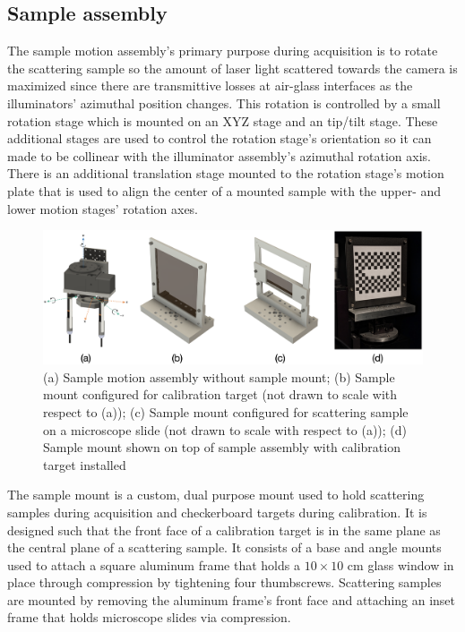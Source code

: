 \subsection{Sample assembly}
The sample motion assembly's primary purpose during acquisition is to rotate the scattering sample so the amount of laser light scattered towards the camera is maximized since there are transmittive losses at air-glass interfaces as the illuminators' azimuthal position changes. This rotation is controlled by a small rotation stage which is mounted on an XYZ stage and an tip/tilt stage. These additional stages are used to control the rotation stage's orientation so it can made to be collinear with the illuminator assembly's azimuthal rotation axis. There is an additional translation stage mounted to the rotation stage's motion plate that is used to align the center of a mounted sample with the upper- and lower motion stages' rotation axes.
%
\begin{figure}
    \centering
    \includegraphics[width=\linewidth]{../figures/sample_assembly_summary.png}
    \caption{(a) Sample motion assembly without sample mount; (b) Sample mount configured for calibration target (not drawn to scale with respect to (a)); (c) Sample mount configured for scattering sample on a microscope slide (not drawn to scale with respect to (a)); (d) Sample mount shown on top of sample assembly with calibration target installed}
    \label{fig:sample_motion_assy}
\end{figure}

The sample mount is a custom, dual purpose mount used to hold scattering samples during acquisition and checkerboard targets during calibration. It is designed such that the front face of a calibration target is in the same plane as the central plane of a scattering sample. It consists of a base and angle mounts used to attach a square aluminum frame that holds a $10 \times 10$ cm glass window in place through compression by tightening four thumbscrews. Scattering samples are mounted by removing the aluminum frame's front face and attaching an inset frame that holds microscope slides via compression.

